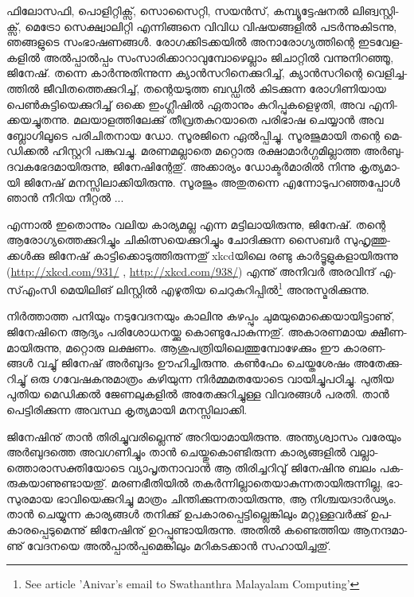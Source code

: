 ­ഫി­ലോ­സ­ഫി, പൊ­ളി­റ്റി­ക്സ്, സൊ­സൈ­റ്റി, സയന്‍­സ്, കമ്പ്യൂ­ട്ടേ­ഷ­നല്‍ ലി­ങ്വ­സ്റ്റി­ക്സ്, മെ­ട്രോ സെ­ക്ഷ്വാ­ലി­റ്റി എന്നി­ങ്ങ­നെ വി­വിധ 
വി­ഷ­യ­ങ്ങ­ളില്‍ പടര്‍­ന്നു­കി­ട­ന്നു, ഞങ്ങ­ളു­ടെ സം­ഭാ­ഷ­ണ­ങ്ങള്‍. രോ­ഗ­ക്കി­ട­ക്ക­യില്‍ അനാ­രോ­ഗ്യ­ത്തി­ന്റെ ഇട­വേ­ള­ക­ളില്‍ 
അല്‍­പ്പാല്‍­പ്പം സം­സാ­രി­ക്കാ­റാ­വു­മ്പോ­ഴെ­ല്ലാം ജി­ചാ­റ്റില്‍ വന്നു­നി­റ­ഞ്ഞൂ, ജി­നേ­ഷ്. തന്നെ കാര്‍­ന്നു­തി­ന്നു­ന്ന ക്യാന്‍­സ­റി­നെ­ക്കു­റി­ച്ച്, 
ക്യാന്‍­സ­റി­ന്റെ വെ­ളി­ച്ച­ത്തില്‍ ജീ­വി­ത­ത്തെ­ക്കു­റി­ച്ച്, തന്റെ­യ­ടു­ത്ത ബഡ്ഡില്‍ കി­ട­ക്കു­ന്ന രോ­ഗി­ണി­യായ പെണ്‍­കു­ട്ടി­യെ­ക്കു­റി­ച്ച് 
ഒക്കെ ഇം­ഗ്ലീ­ഷില്‍ ഏതാ­നും കു­റി­പ്പു­ക­ളെ­ഴു­തി, അവ എനി­ക്ക­യ­ച്ചു­ത­ന്നു. മല­യാ­ള­ത്തി­ലേ­ക്കു് തീ­വ്ര­ത­കു­റ­യാ­തെ പരി­ഭാഷ ചെ­യ്യാന്‍ 
അവ ബ്ലോ­ഗി­ലൂ­ടെ പരി­ചി­ത­നായ ഡോ. സൂ­ര­ജി­നെ ഏല്‍­പ്പി­ച്ചു. സൂ­ര­ജു­മാ­യി തന്റെ മെ­ഡി­ക്കല്‍ ഹി­സ്റ്റ­റി പങ്കു­വ­ച്ചു. മര­ണ­മ­ല്ലാ­തെ 
മറ്റൊ­രു രക്ഷാ­മാര്‍­ഗ്ഗ­മി­ല്ലാ­ത്ത അര്‍­ബു­ദ­വ­ക­ഭേ­ദ­മാ­യി­രു­ന്നു, ജി­നേ­ഷി­ന്റേ­തു്. അക്കാ­ര്യം ഡോ­ക്ടര്‍­മാ­രില്‍ നി­ന്നു കൃ­ത്യ­മാ­യി 
ജി­നേ­ഷ് മന­സ്സി­ലാ­ക്കി­യി­രു­ന്നു. സൂ­ര­ജും അതു­ത­ന്നെ എന്നോ­ടു­പ­റ­ഞ്ഞ­പ്പോള്‍ ഞാന്‍ നീ­റിയ നീ­റ്റല്‍ ...

എ­ന്നാല്‍ ഇതൊ­ന്നും വലിയ കാ­ര്യ­മ­ല്ല എന്ന മട്ടി­ലാ­യി­രു­ന്നു, ജി­നേ­ഷ്. തന്റെ ആരോ­ഗ്യ­ത്തെ­ക്കു­റി­ച്ചും ചി­കി­ത്സ­യെ­ക്കു­റി­ച്ചും 
ചോ­ദി­ക്കു­ന്ന സൈ­ബര്‍ സു­ഹൃ­ത്തു­ക്കള്‍­ക്കു ജി­നേ­ഷ് കാ­ട്ടി­ക്കൊ­ടു­ത്തി­രു­ന്ന­തു് xkcd­യി­ലെ രണ്ടു കാര്‍­ട്ടൂ­ളു­ക­ളാ­യി­രു­ന്നു 
(\url{http://xkcd.com/931/}  , \url{http://xkcd.com/938/}) എന്നു് അനി­വര്‍ അര­വി­ന്ദ് എ­സ്എം­സി­ മെ­യി­ലി­ങ് ലി­സ്റ്റില്‍ എഴു­തിയ 
ചെ­റു­കു­റി­പ്പില്‍\footnote{See article 'Anivar's email to Swathanthra Malayalam Computing'} അനു­സ്മ­രി­ക്കു­ന്നു­. 

നിര്‍­ത്താ­ത്ത പനി­യും നടു­വേ­ദ­ന­യും കാ­ലി­നു കഴ­പ്പും ചു­മ­യു­മൊ­ക്കെ­യാ­യി­ട്ടാ­ണു്, ജി­നേ­ഷി­നെ ആദ്യം പരി­ശോ­ധ­ന­യ്ക്കു 
കൊ­ണ്ടു­പോ­കു­ന്ന­തു്. അകാ­ര­ണ­മായ ക്ഷീ­ണ­മാ­യി­രു­ന്നു, മറ്റൊ­രു ലക്ഷ­ണം. ആശു­പ­ത്രി­യി­ലെ­ത്തു­മ്പോ­ഴേ­ക്കും ഈ 
കാ­ര­ണ­ങ്ങള്‍ വച്ചു് ജി­നേ­ഷ് അര്‍­ബു­ദം ഊഹി­ച്ചി­രു­ന്നു. കണ്‍­ഫേം ചെ­യ്ത­ശേ­ഷം അതേ­ക്കു­റി­ച്ചു് ഒരു ഗവേ­ഷ­ക­നു­മാ­ത്രം 
കഴി­യു­ന്ന നിര്‍­മ്മ­മ­ത­യോ­ടെ വാ­യി­ച്ചു­പ­ഠി­ച്ചു. പു­തിയ പു­തിയ മെ­ഡി­ക്കല്‍ ജേ­ണ­ലു­ക­ളില്‍ അതേ­ക്കു­റി­ച്ചു­ള്ള വി­വ­ര­ങ്ങള്‍ പര­തി. 
താന്‍ പെ­ട്ടി­രി­ക്കു­ന്ന അവ­സ്ഥ കൃ­ത്യ­മാ­യി മന­സ്സി­ലാ­ക്കി­.

­ജി­നേ­ഷി­നു് താന്‍ തി­രി­ച്ചു­വ­രി­ല്ലെ­ന്നു് അറി­യാ­മാ­യി­രു­ന്നു. അന്ത്യ­ശ്വാ­സം വരേ­യും അര്‍­ബു­ദ­ത്തെ അവ­ഗ­ണി­ച്ചും താന്‍ 
ചെ­യ്തു­കൊ­ണ്ടി­രു­ന്ന കാ­ര്യ­ങ്ങ­ളില്‍ വല്ലാ­ത്തൊ­രാ­സ­ക്തി­യോ­ടെ വ്യാ­പൃ­ത­നാ­വാന്‍ ആ തി­രി­ച്ച­റി­വു് ജി­നേ­ഷി­നു ബലം 
പക­രു­ക­യാ­ണു­ണ്ടാ­യ­തു്. മര­ണ­ഭീ­തി­യില്‍ തകര്‍­ന്നി­ല്ലാ­തെ­യാ­കു­ന്ന­താ­യി­രു­ന്നി­ല്ല, ഭാ­സു­ര­മായ ഭാ­വി­യെ­ക്കു­റി­ച്ചു മാ­ത്രം 
ചി­ന്തി­ക്കു­ന്ന­താ­യി­രു­ന്നു, ആ നി­ശ്ച­യ­ദാര്‍­ഢ്യം. താന്‍ ചെ­യ്യു­ന്ന കാ­ര്യ­ങ്ങള്‍ തനി­ക്കു് ഉപ­കാ­ര­പ്പെ­ട്ടി­ല്ലെ­ങ്കി­ലും മറ്റു­ള്ള­വര്‍­ക്കു് 
ഉപ­കാ­ര­പ്പെ­ടു­മെ­ന്നു് ജി­നേ­ഷി­നു് ഉറ­പ്പു­ണ്ടാ­യി­രു­ന്നു. അതില്‍ കണ്ടെ­ത്തിയ ആന­ന്ദ­മാ­ണു് വേ­ദ­ന­യെ അല്‍­പ്പാല്‍­പ്പ­മെ­ങ്കി­ലും 
മറി­ക­ട­ക്കാന്‍ സഹാ­യി­ച്ച­തു്.

